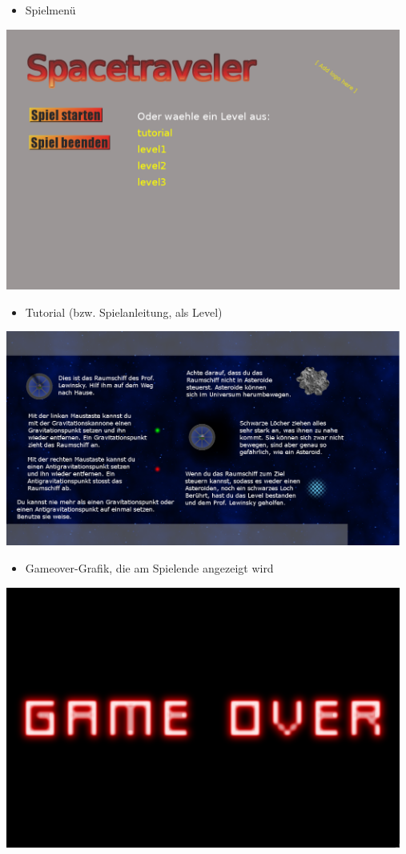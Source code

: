 \documentclass[12pt,a4paper]{scrartcl}
\begin{document}
\begin{itemize}
\item Spielmenü
\end{itemize}
\includegraphics[width=13cm]{img/menu.png}\\

\begin{itemize}
\item Tutorial (bzw. Spielanleitung, als Level)
\end{itemize}
\includegraphics[width=13cm]{img/tut.png}\\

\begin{itemize}
\item Gameover-Grafik, die am Spielende angezeigt wird
\end{itemize}
\includegraphics[width=13cm]{img/gameover.png}\\
\end{document}
